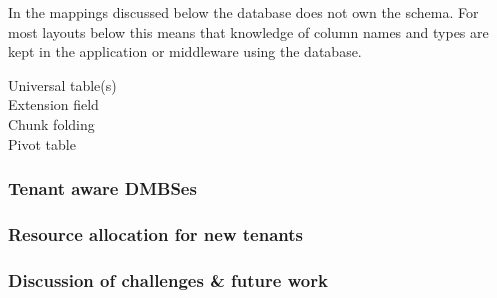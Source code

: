 In the mappings discussed below the database does not own the schema. 
For most layouts below this means that knowledge of column names and types are kept in the application or middleware using the database.
\begin{description}
	\item[Universal table(s)]
	\item[Extension field]
	\item[Chunk folding] %
	\item[Pivot table]
\end{description}
\subsubsection{Tenant aware DMBSes}

\subsubsection{Resource allocation for new tenants}

\subsubsection{Discussion of challenges \& future work}

